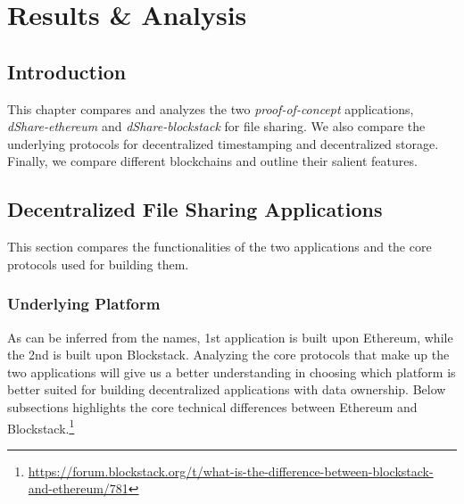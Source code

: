 \chapter{Results \& Analysis}\label{chapter::results}
	\section{Introduction}
		This chapter compares and analyzes the two \textit{proof-of-concept} applications, \textit{dShare-ethereum} and \textit{dShare-blockstack} for file sharing. We also compare the underlying protocols for decentralized timestamping and decentralized storage. Finally, we compare different blockchains and outline their salient features.
		
	\section{Decentralized File Sharing Applications}
		This section compares the functionalities of the two applications and the core protocols used for building them.
		
		\subsection{Underlying Platform}
		As can be inferred from the names, 1st application is built upon Ethereum\cite{buterin2014ethereum}, while the 2nd is built upon Blockstack\cite{ali2016blockstack}. Analyzing the core protocols that make up the two applications will give us a better understanding in choosing which platform is better suited for building decentralized applications with data ownership. Below subsections highlights the core technical differences between Ethereum and Blockstack.\footnote{\url{https://forum.blockstack.org/t/what-is-the-difference-between-blockstack-and-ethereum/781}}
		
